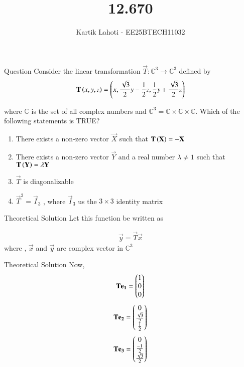 \documentclass{beamer}
\title %
{12.670}
\author 
{Kartik Lahoti - EE25BTECH11032}
\begin{document}
\frame{\titlepage}
\begin{frame}{Question}
Consider the linear transformation $\vec{T} \colon \mathbb{C}^3 \xrightarrow{} \mathbb{C}^3$ defined by 
\begin{align*}
    \mathbf{T}\left(x,y,z\right) = \left(x,\frac{\sqrt{3}}{2}y - \frac{1}{2}z , \frac{1}{2}y+\frac{\sqrt{3}}{2}z\right)
\end{align*}

where $\mathbb{C}$ is the set of all complex numbers and $\mathbb{C}^3 = \mathbb{C}\times\mathbb{C}\times\mathbb{C} $. Which of the following statements is TRUE?

\begin{enumerate}
        \item There exists a non-zero vector $\vec{X}$ such that $\mathbf{T}\left(\mathbf{X}\right) = -\mathbf{X}$
        \item There exists a non-zero vector $\vec{Y}$ and a real number  $\lambda \neq 1$  such that $\mathbf{T}\left(\mathbf{Y}\right) = \lambda\mathbf{Y}$
        \item $\vec{T}$ is diagonalizable
        \item $\vec{T}^2 = \vec{I}_3$ , where $\vec{I}_3$ us the $3\times 3$ identity matrix
    \end{enumerate}
\end{frame}

\begin{frame}{Theoretical Solution}
Let this function be written as 

\begin{align}
    \vec{y} = \vec{T}\vec{x}
\end{align}
where , $\vec{x} $ and $\vec{y}$ are complex vector in $\mathbb{C}^3$
\end{frame}

\begin{frame}{Theoretical Solution}
Now, 
\begin{align}
    \mathbf{T}\mathbf{e_1} = \begin{pmatrix}1\\ 0 \\ 0\end{pmatrix} 
\end{align}
\begin{align}
    \mathbf{T}\mathbf{e_2}  = \begin{pmatrix}0\\ \frac{\sqrt{3}}{2} \\ \frac{1}{2}\end{pmatrix} 
\end{align}
\begin{align}
    \mathbf{T}\mathbf{e_3}  = \begin{pmatrix}0\\ \frac{-1}{2} \\ \frac{\sqrt{3}}{2}\end{pmatrix} 
\end{align}


\end{frame}
\end{document}
